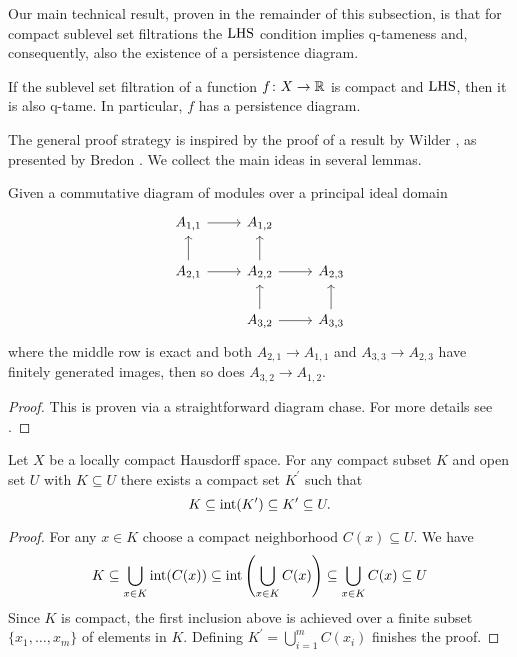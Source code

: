 Our main technical result, proven in the remainder of this subsection, is that for compact sublevel set filtrations the $\mathrm{LHS}$ condition implies \mbox{q-tameness} and, consequently, also the existence of a persistence diagram.

\begin{thm} \label{t:local connectedness implies q-tameness}
	If the sublevel set filtration of a function $f \colon X \to \mathbb{R}$ is compact and	$\mathrm{LHS}$, then it is also q-tame.
	In particular, $f$ has a persistence diagram.
\end{thm}

The general proof strategy is inspired by the proof of a result by Wilder \cite[p.~325]{Wilder.1949}, as presented by Bredon \cite[Section II.17]{Bredon.1997}.
We collect the main ideas in several lemmas.

\begin{lem} \label{l:commutative algebra}
	Given a commutative diagram of modules over a principal ideal domain
	\begin{equation*}
	\begin{tikzcd}
	A_{1,1} \arrow[r] & A_{1,2} & \\
	A_{2,1} \arrow[r] \arrow[u] & A_{2,2} \arrow[r] \arrow[u] & A_{2,3} \\
	& A_{3,2} \arrow[r] \arrow[u] & A_{3,3} \arrow[u]
	\end{tikzcd}
	\end{equation*}
	where the middle row is exact and both $A_{2,1} \to A_{1,1}$ and $A_{3,3} \to A_{2,3}$ have finitely generated images, then so does $A_{3,2} \to A_{1,2}$.
\end{lem}

\begin{proof}
	This is proven via a straightforward diagram chase.
	For more details see \cite[Lemma II.17.3]{Bredon.1997}.
\end{proof}

\begin{lem} \label{l:neighborhood third}
	Let $X$ be a locally compact Hausdorff space.
	For any compact subset $K$ and open set $U$ with $K \subseteq U$ there exists a compact set $K^\prime$ such that
	\begin{equation*}
	K \subseteq \operatorname{int}(K^\prime) \subseteq K^\prime \subseteq U.
	\end{equation*}
\end{lem}

\begin{proof}
	For any $x \in K$ choose a compact neighborhood $C(x) \subseteq U$.
	We have
	\begin{equation*}
	K \subseteq \bigcup_{x \in K} \operatorname{int}(C(x)) \subseteq \operatorname{int}\left(\bigcup_{x \in K} C(x)\right) \subseteq \bigcup_{x \in K} C(x) \subseteq U
	\end{equation*}
	Since $K$ is compact, the first inclusion above is achieved over a finite subset $\{x_1, \dots, x_m\}$ of elements in $K$.
	Defining $K^\prime = \bigcup_{i=1}^m C(x_i)$ finishes the proof.
\end{proof}

